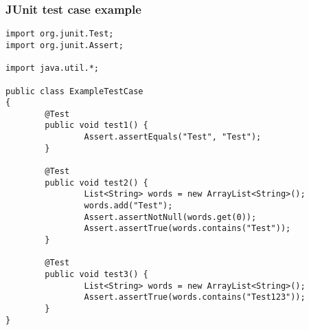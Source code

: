 \begin{frame}[fragile, hasprev=false, hasnext=false]
\frametitle{JUnit test case example}
\label{example:junit-testcase}

\begin{lstlisting}
import org.junit.Test;
import org.junit.Assert;

import java.util.*;

public class ExampleTestCase
{
        @Test
        public void test1() {
                Assert.assertEquals("Test", "Test");
        }

        @Test
        public void test2() {
                List<String> words = new ArrayList<String>();
                words.add("Test");
                Assert.assertNotNull(words.get(0));
                Assert.assertTrue(words.contains("Test"));
        }

        @Test
        public void test3() {
                List<String> words = new ArrayList<String>();
                Assert.assertTrue(words.contains("Test123"));
        }
}
\end{lstlisting}
\end{frame}